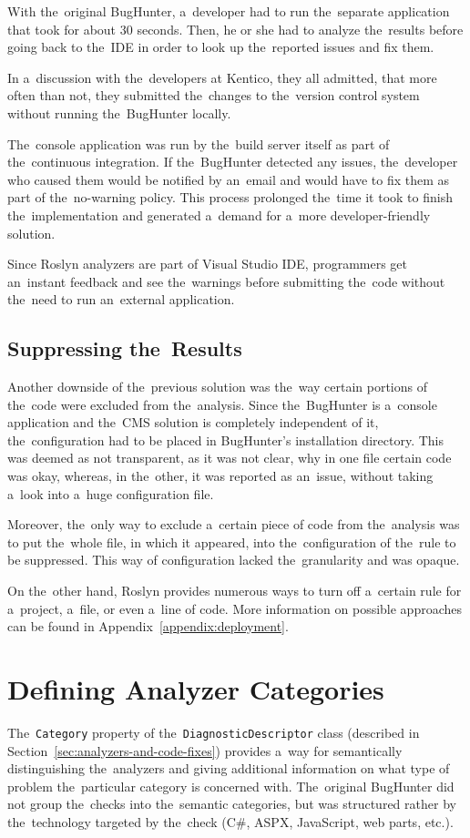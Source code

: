 \documentclass[
  digital, %
  table,   %
  lof,     %
  lot,     %
  oneside,
]{fithesis3}
\begin{document}
With the~original BugHunter, a~developer had to run the~separate application that took for about 30 seconds. Then, he or she had to analyze the~results before going back to the~IDE in order to look up the~reported issues and fix them. 

In a~discussion with the~developers at Kentico, they all admitted, that more often than not, they submitted the~changes to the~version control system without running the~BugHunter locally. 

The~console application was run by the~build server itself as part of the~continuous integration. If the~BugHunter detected any issues, the~developer who caused them would be notified by an~email and would have to fix them as part of the~no-warning policy. This process prolonged the~time it took to finish the~implementation and generated a~demand for a~more developer-friendly solution. 

Since Roslyn analyzers are part of Visual Studio IDE, programmers get an~instant feedback and see the~warnings before submitting the~code without the~need to run an~external application.

\subsection{Suppressing the~Results}
Another downside of the~previous solution was the~way certain portions of the~code were excluded from the~analysis. Since the~BugHunter is a~console application and the~CMS solution is completely independent of it, the~configuration had to be placed in BugHunter's installation directory. This was deemed as not transparent, as it was not clear, why in one file certain code was okay, whereas, in the~other, it was reported as an~issue, without taking a~look into a~huge configuration file.

Moreover, the~only way to exclude a~certain piece of code from the~analysis was to put the~whole file, in which it appeared, into the~configuration of the~rule to be suppressed. This way of configuration lacked the~granularity and was opaque. 

On the~other hand, Roslyn provides numerous ways to turn off a~certain rule for a~project, a~file, or even a~line of code. More information on possible approaches can be found in Appendix~\ref{appendix:deployment}.

\section{Defining Analyzer Categories}
\label{sec:analyzer-categories}
The~\texttt{Category} property of the~\texttt{DiagnosticDescriptor} class (described in Section~\ref{sec:analyzers-and-code-fixes}) provides a~way for semantically distinguishing the~analyzers and giving additional information on what type of problem the~particular category is concerned with. The~original BugHunter did not group the~checks into the~semantic categories, but was structured rather by the~technology targeted by the~check (C\#, ASPX, JavaScript, web parts, etc.). 
\end{document}
